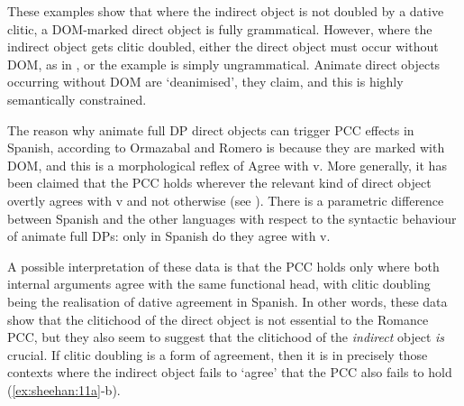 \documentclass[output=paper,colorlinks,citecolor=brown,nonflat]{./langscibook}
\begin{document}
These examples show that where the indirect object is not doubled by a dative clitic, a DOM-marked direct object is fully grammatical. However, where the indirect object gets clitic doubled, either the direct object must occur without DOM, as in , or the example is simply ungrammatical. Animate direct objects occurring without DOM are ‘deanimised’, they claim, and this is highly semantically constrained. 

The reason why animate full DP direct objects can trigger PCC effects in Spanish, according to Ormazabal and Romero is because they are marked with DOM, and this is a morphological reflex of Agree with v. More generally, it has been claimed that the PCC holds wherever the relevant kind of direct object overtly agrees with v and not otherwise (see \citealt{Preminger2019}). There is a parametric difference between Spanish and the other languages with respect to the syntactic behaviour of animate full DPs: only in Spanish do they agree with v. 

A possible interpretation of these data is that the PCC holds only where both internal arguments agree with the same functional head, with clitic doubling being the realisation of dative agreement in Spanish. In other words, these data show that the clitichood of the direct object is not essential to the Romance PCC, but they also seem to suggest that the clitichood of the \textit{indirect} object \textit{is} crucial. If clitic doubling is a form of agreement, then it is in precisely those contexts where the indirect object fails to ‘agree’ that the PCC also fails to hold (\ref{ex:sheehan:11a}-b). 
\end{document}
